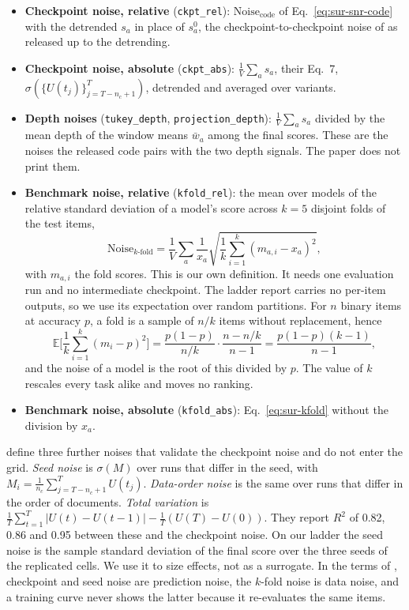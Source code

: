 \begin{itemize}[itemsep=1pt,topsep=2pt]
\item \textbf{Checkpoint noise, relative} (\texttt{ckpt\_rel}): $\text{Noise}_{\text{code}}$ of Eq.~\ref{eq:sur-snr-code} with the detrended $s_a$ in place of $s^{0}_a$, the checkpoint-to-checkpoint noise of \citet{heineman_signal_2025} as released up to the detrending.
\item \textbf{Checkpoint noise, absolute} (\texttt{ckpt\_abs}): $\frac{1}{V}\sum_a s_a$, their Eq.~7, $\sigma(\{U(t_j)\}_{j=T-n_c+1}^{T})$, detrended and averaged over variants.
\item \textbf{Depth noises} (\texttt{tukey\_depth}, \texttt{projection\_depth}): $\frac{1}{V}\sum_a s_a$ divided by the mean depth of the window means $\bar{w}_a$ among the final scores. These are the noises the released code pairs with the two depth signals. The paper does not print them.
\item \textbf{Benchmark noise, relative} (\texttt{kfold\_rel}): the mean over models of the relative standard deviation of a model's score across $k = 5$ disjoint folds of the test items,
\begin{equation}
\text{Noise}_{k\text{-fold}} = \frac{1}{V}\sum_a \frac{1}{x_a}\sqrt{\frac{1}{k}\sum_{i=1}^{k}(m_{a,i} - x_a)^2},
\label{eq:sur-kfold}
\end{equation}
with $m_{a,i}$ the fold scores. This is our own definition. It needs one evaluation run and no intermediate checkpoint.
The ladder report carries no per-item outputs, so we use its expectation over random partitions. For $n$ binary items at accuracy $p$, a fold is a sample of $n/k$ items without replacement, hence
\begin{equation}
\mathbb{E}\Big[\frac{1}{k}\sum_{i=1}^{k}(m_i - p)^2\Big] = \frac{p(1-p)}{n/k}\cdot\frac{n - n/k}{n - 1} = \frac{p(1-p)(k-1)}{n-1},
\label{eq:sur-kfold-closed}
\end{equation}
and the noise of a model is the root of this divided by $p$. The value of $k$ rescales every task alike and moves no ranking.
\item \textbf{Benchmark noise, absolute} (\texttt{kfold\_abs}): Eq.~\ref{eq:sur-kfold} without the division by $x_a$.
\end{itemize}

\citet{heineman_signal_2025} define three further noises that validate the checkpoint noise and do not enter the grid.
\emph{Seed noise} is $\sigma(M)$ over runs that differ in the seed, with $M_i = \frac{1}{n_c}\sum_{j=T-n_c+1}^{T} U(t_j)$. \emph{Data-order noise} is the same over runs that differ in the order of documents.
\emph{Total variation} is $\frac{1}{T}\sum_{t=1}^{T}|U(t) - U(t-1)| - \frac{1}{T}(U(T) - U(0))$.
They report $R^2$ of 0.82, 0.86 and 0.95 between these and the checkpoint noise.
On our ladder the seed noise is the sample standard deviation of the final score over the three seeds of the replicated cells. We use it to size effects, not as a surrogate.
In the terms of \citet{wang_measuring_2025}, checkpoint and seed noise are prediction noise, the $k$-fold noise is data noise, and a training curve never shows the latter because it re-evaluates the same items.

